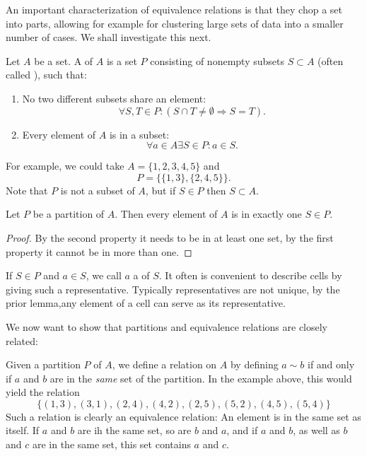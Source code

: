 An important characterization of equivalence relations is that they chop a
set into parts, allowing for example for clustering large sets of data into
a smaller number of cases. We shall investigate this next.
\begin{defn}
Let $A$ be a set. A  of $A$ is a set $P$ consisting of nonempty
subsets $S\subset A$ (often called ), such that:
\begin{enumerate}
\item No two different subsets share an element:
\[
\forall S,T\in P: (S\cap T\not=\emptyset\Rightarrow S=T).
\]
\item Every element of $A$ is in a subset: 
\[
\forall a\in A\exists S\in P: a\in S.
\]
\end{enumerate}
\end{defn}
For example, we could take $A=\{1,2,3,4,5\}$ and 
\[
P=\{\{1,3\},\{2,4,5\}\}.
\]
Note that $P$ is not a subset of $A$, but if $S\in P$ then $S\subset A$.

\begin{lemma}
Let $P$ be a partition of $A$. Then every element of $A$ is in exactly one $S\in P$.
\end{lemma}
\begin{proof}
By the second property it needs to be in at least one set, by the first property it
cannot be in more than one.
\end{proof}

If $S\in P$ and $a\in S$, we call $a$ a  of $S$.  It often is
convenient to describe cells by giving such a representative. Typically representatives
are not unique, by the prior lemma,any element of a cell can serve as its
representative.
\bigskip

We now want to show that partitions and equivalence relations are closely related:

Given a partition $P$ of $A$, we define a relation on $A$ by
defining $a\sim b$ if and only if $a$ and $b$ are in the {\em same} set of
the partition. In the example above, this would yield the relation
\[
\{(1,3),(3,1),(2,4),(4,2),(2,5),(5,2),(4,5),(5,4)\}
\]
Such a relation is clearly an equivalence relation: An element is in the
same set as itself. If $a$ and $b$ are ih the same set, so are $b$ and $a$,
and if $a$ and $b$, as well as $b$ and $c$ are in the same set, this set
contains $a$ and $c$.


